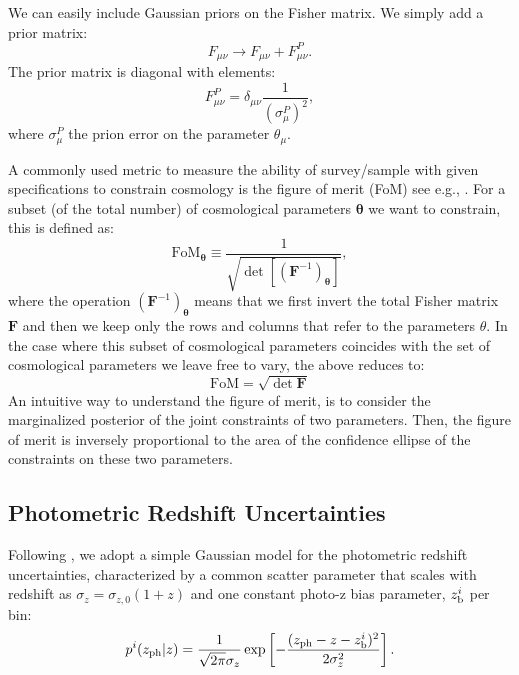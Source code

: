 \documentclass[a4paper,fleqn,usenatbib]{mnras}
\begin{document}
We can easily include Gaussian priors on the Fisher matrix. We simply add a prior matrix:
\begin{equation}
\label{eq: prior_F}
F_{\mu \nu} \to F_{\mu \nu} + F^P_{\mu \nu}.
\end{equation}
The prior matrix is diagonal with elements:
\begin{equation}
F^P_{\mu \nu} = \delta_{\mu \nu}\frac{1}{(\sigma^P_{\mu})^2},
\end{equation}
where $\sigma^P_{\mu}$ the prion error on the parameter $\theta_\mu$.

A commonly used metric to measure the ability of survey/sample with given specifications to constrain cosmology is the figure of merit (FoM) see e.g., \citealt{Albrecht2006} . For a subset (of the total number) of cosmological parameters $\mathbf{\theta}$ we want to constrain, this is defined as:
\begin{equation}
\label{eq: FoM_1}
\mbox{FoM}_\mathbf{\theta} \equiv \frac{1}{ \sqrt{\det\left[ (\mathbf{F}^{-1})_\mathbf{\theta}\right]}},
\end{equation}
where the operation $(\mathbf{F}^{-1})_\mathbf{\theta}$ means that we first invert the total Fisher matrix $\mathbf{F}$ and then we keep only the rows and columns that refer to the parameters $\theta$.
In the case where this subset of cosmological parameters coincides with the set of cosmological parameters we leave free to vary, the above reduces to:
\begin{equation}
\mbox{FoM} = \sqrt{\det{\mathbf{F}}}
\end{equation}
An intuitive way to understand the figure of merit, is to consider the marginalized posterior of the joint constraints of two parameters. Then, the figure of merit is inversely proportional to the area of the confidence ellipse of the constraints on these two parameters.

\subsection{Photometric Redshift Uncertainties }
\label{subsec: Photo-zs}

Following \citealt{Ma2006}, we adopt a  simple Gaussian model for the photometric redshift uncertainties, characterized by a common scatter parameter that scales with redshift  as $\sigma_z = \sigma_{z,0}(1+z)$ and one constant photo-z bias parameter, $z^i_{\mbox{\scriptsize{b}}}$ per bin:
\begin{equation}
p^i(z_{\mbox{\scriptsize{ph}}}|z) = \frac{1}{\sqrt{2\pi} \sigma_z}\exp\left[-\frac{(z_{\mbox{\scriptsize{ph}}}-z-z^i_{\mbox{\scriptsize{b}}})^2}{2\sigma_z^2}\right].
\end{equation}
\end{document}
